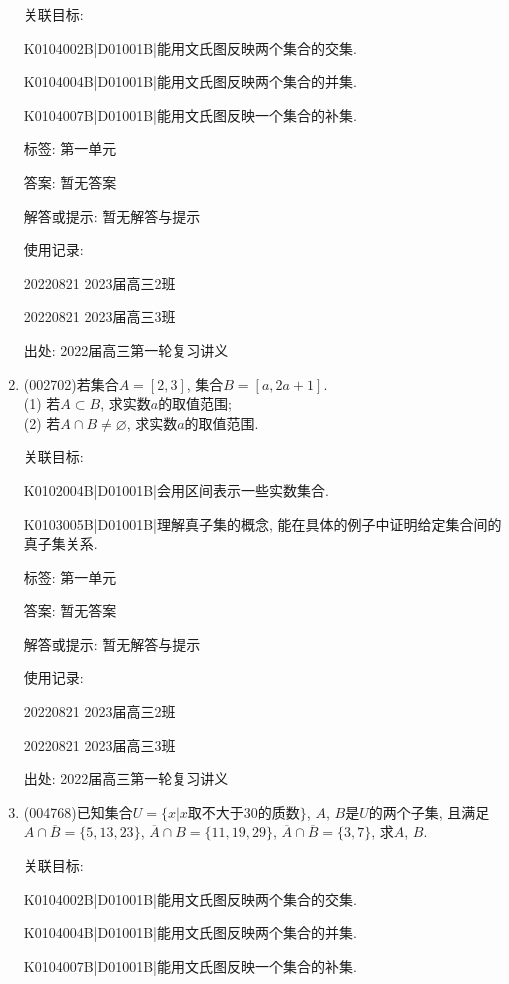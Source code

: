 \documentclass[10pt,a4paper]{article}
\begin{document}
\begin{enumerate}[1.]
关联目标:

K0104002B|D01001B|能用文氏图反映两个集合的交集.

K0104004B|D01001B|能用文氏图反映两个集合的并集.

K0104007B|D01001B|能用文氏图反映一个集合的补集.



标签: 第一单元

答案: 暂无答案

解答或提示: 暂无解答与提示

使用记录:

20220821	2023届高三2班	

20220821	2023届高三3班		


出处: 2022届高三第一轮复习讲义
\item { (002702)}若集合$A=[2,3]$, 集合$B=[a,2a+1]$.\\
(1) 若$A\subset B$, 求实数$a$的取值范围;\\
(2) 若$A\cap B\ne \varnothing$, 求实数$a$的取值范围.


关联目标:

K0102004B|D01001B|会用区间表示一些实数集合.

K0103005B|D01001B|理解真子集的概念, 能在具体的例子中证明给定集合间的真子集关系.



标签: 第一单元

答案: 暂无答案

解答或提示: 暂无解答与提示

使用记录:

20220821	2023届高三2班		

20220821	2023届高三3班	


出处: 2022届高三第一轮复习讲义
\item { (004768)}已知集合$U =\{x|x\text{取不大于}30\text{的质数}\}$, $A$, $B$是$U$的两个子集, 且满足$A\cap \overline B=\{5,13,23\}$, $\overline A\cap B=\{11,19,29\}$, $\overline A\cap \overline B=\{3,7\}$, 求$A$, $B$.


关联目标:

K0104002B|D01001B|能用文氏图反映两个集合的交集.

K0104004B|D01001B|能用文氏图反映两个集合的并集.

K0104007B|D01001B|能用文氏图反映一个集合的补集.




\end{enumerate}
\end{document}
